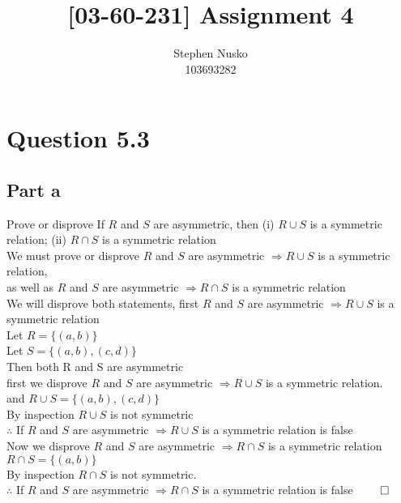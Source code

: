\documentclass{article}
\title{[03-60-231] Assignment 4}
\author{Stephen Nusko \\ 103693282}
\begin{document}
	\thispagestyle{empty}
	\maketitle	
	\section{Question 5.3}
		\subsection{Part a}
			Prove or disprove If $R$ and $S$ are asymmetric, then (i) $R \cup S$ is a symmetric relation; (ii) $R \cap S$ is a symmetric relation \\
			We must prove or disprove $R$ and $S$ are asymmetric $\Rightarrow R \cup S$ is a symmetric relation, \\
			as well as $R$ and $S$ are asymmetric $\Rightarrow R \cap S$ is a symmetric relation \\
			We will disprove both statements, first $R$ and $S$ are asymmetric $\Rightarrow R \cup S$ is a symmetric relation \\
			Let $R = \{(a, b)\}$ \\
			Let $S = \{(a, b), (c, d)\}$ \\
			Then both R and S are asymmetric \\
			first we disprove $R$ and $S$ are asymmetric $\Rightarrow R \cup S$ is a symmetric relation. \\
			and $R \cup S = \{(a, b), (c, d)\}$ \\
			By inspection $R \cup S$ is not symmetric \\
			$\therefore$ If $R$ and $S$ are asymmetric $\Rightarrow R \cup S$ is a symmetric relation is false \\
			Now we disprove $R$ and $S$ are asymmetric $\Rightarrow R \cap S$ is a symmetric relation \\
			$R \cap S = \{(a, b)\}$ \\
			By inspection $R \cap S$ is not symmetric. \\
			$\therefore$ If $R$ and $S$ are asymmetric $\Rightarrow R \cap S$ is a symmetric relation is false \hfill $\qed$
\end{document}
